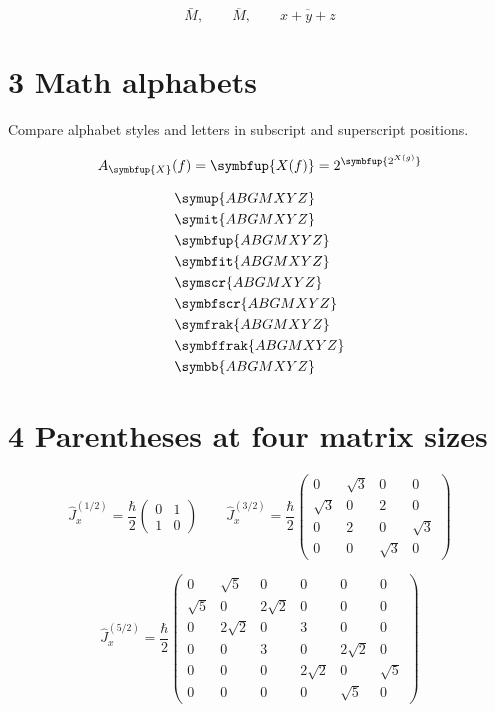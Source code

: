 \documentclass[a4paper,10pt]{article}
\begin{document}
\[
\bar{M},\qquad\overline{M},\qquad\overline{x+y+z}
\]

\section*{3 Math alphabets}
Compare alphabet styles and letters in subscript and superscript positions.

\[
A_{\symbfup{X}}(f)=\symbfup{X(f)}=2^{\symbfup{2^{X(g)}}}
\]

\[
\begin{aligned}
& \symup{ABGMXYZ} \\
& \symit{ABGMXYZ} \\
& \symbfup{ABGMXYZ} \\
& \symbfit{ABGMXYZ} \\
& \symscr{ABGMXYZ} \\
& \symbfscr{ABGMXYZ} \\
& \symfrak{ABGMXYZ} \\
& \symbffrak{ABGMXYZ} \\
& \symbb{ABGMXYZ}
\end{aligned}
\]

\clearpage
\section*{4 Parentheses at four matrix sizes}

\[
\hat J_x^{(1/2)}=\frac{\hbar}{2}
\begin{pmatrix}
0 & 1 \\
1 & 0
\end{pmatrix}
\qquad
\hat J_x^{(3/2)}=\frac{\hbar}{2}
\begin{pmatrix}
0 & \sqrt{3} & 0 & 0 \\
\sqrt{3} & 0 & 2 & 0 \\
0 & 2 & 0 & \sqrt{3} \\
0 & 0 & \sqrt{3} & 0
\end{pmatrix}
\]

\[
\hat J_x^{(5/2)}=\frac{\hbar}{2}
\begin{pmatrix}
0 & \sqrt{5} & 0 & 0 & 0 & 0 \\
\sqrt{5} & 0 & 2\sqrt{2} & 0 & 0 & 0 \\
0 & 2\sqrt{2} & 0 & 3 & 0 & 0 \\
0 & 0 & 3 & 0 & 2\sqrt{2} & 0 \\
0 & 0 & 0 & 2\sqrt{2} & 0 & \sqrt{5} \\
0 & 0 & 0 & 0 & \sqrt{5} & 0
\end{pmatrix}
\]
\end{document}
